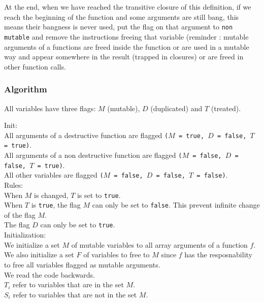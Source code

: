 \documentclass[12pt,a4paper]{article}
\newcommand{\cl}[1]{\texttt{#1}}
\begin{document}
At the end, when we have reached the transitive closure of this definition, if we reach the beginning of the function and some arguments are still bang, this means their bangness is never used, put the flag on that argument to \cl{non mutable} and remove the instructions freeing that variable (reminder : mutable arguments of a functions are freed inside the function or are used in a mutable way and appear somewhere in the result (trapped in closures) or are freed in other function calls.



\subsubsection{Algorithm}




All variables have three flags: $M$ (mutable), $D$ (duplicated) and $T$ (treated).

Init:\\
All arguments of a destructive function are flagged \cl{($M$ = true, $D$ = false, $T$ = true)}.\\
All arguments of a non destructive function are flagged \cl{($M$ = false, $D$ = false, $T$ = true)}.\\
All other variables are flagged \cl{($M$ = false, $D$ = false, $T$ = false)}.\\

Rules:\\
When $M$ is changed, $T$ is set to \cl{true}.\\
When $T$ is \cl{true}, the flag $M$ can only be set to \cl{false}.
This prevent infinite change of the flag $M$.\\
The flag $D$ can only be set to \cl{true}.\\



Initialization:\\


We initialize a set $M$ of mutable variables to all array arguments of a function $f$.
We also initialize a set $F$ of variables to free to $M$ since $f$ has the resposnability to free all variables flagged as mutable arguments.\\

We read the code backwards.\\
$T_i$ refer to variables that are in the set $M$.\\
$S_i$ refer to variables that are not in the set $M$.
\end{document}
